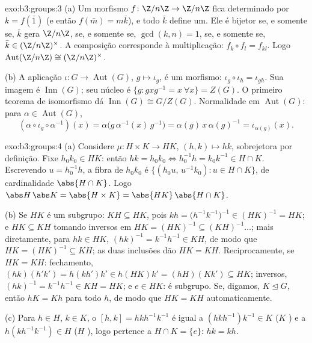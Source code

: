 \begin{solution}{exo:b3:groups:3}
(a) Um morfismo $f \colon \Z/n\Z \to \Z/n\Z$ fica determinado por $k =
f(\bar 1)$ (e então $f(\bar m) = m\bar k$), e todo
$\bar k$ define um. Ele é bijetor se, e somente se, $\bar k$ gera
$\Z/n\Z$, se, e somente se, $\gcd(k,n) = 1$, se, e somente se, $\bar k \in (\Z/n\Z)^\times$. A composição
corresponde à multiplicação: $f_k \circ f_l = f_{kl}$. Logo $\operatorname{Aut}(\Z/n\Z) \cong (\Z/n\Z)^\times$.

(b) A aplicação $\iota\colon G \to \operatorname{Aut}(G)$, $g \mapsto
\iota_g$, é um morfismo: $\iota_g \circ \iota_h = \iota_{gh}$. Sua imagem é $\operatorname{Inn}(G)$; seu
núcleo é $\{g : gxg^{-1} =
x\ \forall x\} = Z(G)$. O primeiro teorema de isomorfismo dá $\operatorname{Inn}(G) \cong G/Z(G)$. Normalidade em
$\operatorname{Aut}(G)$: para $\alpha \in \operatorname{Aut}(G)$,
\[
(\alpha \circ \iota_g \circ \alpha^{-1})(x)
= \alpha\bigl(g\,\alpha^{-1}(x)\,g^{-1}\bigr)
= \alpha(g)\, x\, \alpha(g)^{-1} = \iota_{\alpha(g)}(x).
\]
\end{solution}

\begin{solution}{exo:b3:groups:4}
(a) Considere $\mu \colon H \times K \to HK$, $(h,k) \mapsto hk$, sobrejetora por definição. Fixe $h_0k_0 \in HK$: então
$hk = h_0k_0
\iff h_0^{-1}h = k_0 k^{-1} \in H \cap K$. Escrevendo $u =
h_0^{-1}h$, a fibra de $h_0k_0$ é $\{(h_0u,\, u^{-1}k_0) : u
\in H \cap K\}$, de cardinalidade
$\abs{H \cap K}$. Logo $\abs
H\,\abs K = \abs{H\times K} = \abs{HK}\,\abs{H \cap K}$.

(b) Se $HK$ é um subgrupo: $KH \subseteq HK$, pois $kh =
\bigl(h^{-1}k^{-1}\bigr)^{-1} \in (HK)^{-1} = HK$; e $HK
\subseteq KH$ tomando inversos em
$HK = (HK)^{-1} \subseteq
(KH)^{-1}\dots$; mais diretamente, para $hk \in HK$, $(hk)^{-1} =
k^{-1}h^{-1} \in KH$, de modo que $HK = (HK)^{-1} \subseteq KH$; as duas
inclusões dão $HK = KH$. Reciprocamente, se $HK = KH$: fechamento, $(hk)(h'k') = h(kh')k' \in h(HK)k' = (hH)(Kk') \subseteq HK$; inversos,
$(hk)^{-1} = k^{-1}h^{-1} \in KH = HK$; e $e \in HK$: é subgrupo. Se, digamos, $K \trianglelefteq G$, então $hK = Kh$ para todo
$h$, de modo que $HK = KH$ automaticamente.

(c) Para $h \in H$, $k \in K$, o  $[h,k] = hkh^{-1}
k^{-1}$ é igual a $(hkh^{-1})k^{-1} \in K$ ($K$ )
e a $h(kh^{-1}k^{-1}) \in H$ ($H$ ), logo pertence a $H \cap K =
\{e\}$: $hk = kh$.
\end{solution}

